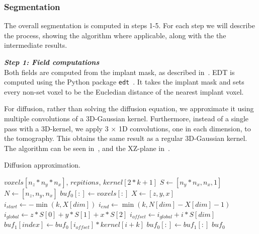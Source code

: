 \subsubsection{Segmentation}
The overall segmentation is computed in steps 1-5. For each step we will describe the process, showing
the algorithm where applicable, along with the the intermediate results.

\vspace{\baselineskip}
\noindent\textit{\textbf{Step 1: Field computations}}\\
Both fields are computed from the implant mask, as described in~.
EDT is computed using the Python package \texttt{edt}~\cite{pypi-edt}. It takes the implant mask and
sets every non-set voxel to be the Eucledian distance of the nearest implant voxel.

For diffusion, rather than solving the diffusion equation, we approximate it using multiple convolutions
of a 3D-Gaussian kernel. Furthermore, instead of a single pass with a 3D-kernel, we apply 3 $\times$ 1D
convolutions, one in each dimension, to the tomography. This obtains the same result as a regular 3D-Gaussian
kernel. The algorithm can be seen in~, and the XZ-plane in~.

\begin{algorithm}
    \caption{Diffusion approximation.}
    \label{alg:diffusion}
    \begin{algorithmic}
         {$voxels[n_z*n_y*n_x]$, $repitions$, \newline \indent \indent $kernel[2*k+1]$}
            \State $S \gets [n_y * n_x, n_x, 1]$
            \State $N \gets [n_z, n_y, n_x]$
            \State $buf_0[:] \gets voxels[:]$
                        \State $X \gets [z,y,x]$
                        \State $i_{start} \gets - \min (k, X[dim])$
                        \State $i_{end} \gets \min (k, N[dim] - X[dim] - 1)$
                        \State $i_{global} \gets z*S[0] + y*S[1] + x*S[2]$
                            \State $i_{offset} \gets i_{global} + i*S[dim]$
                            \State $buf_1[index] \gets buf_0[i_{offset}] * kernel[i+k]$
                        \EndFor
                    \EndFor
                    \State $buf_0[:] \gets buf_1[:]$
                \EndFor
            \EndFor
            \Return $buf_0$
        \EndFunction
    \end{algorithmic}
\end{algorithm}

